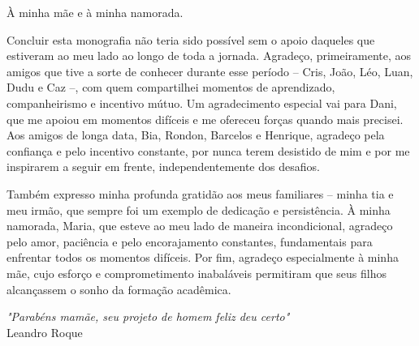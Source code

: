 \documentclass[embeddedlogo, nohidelinks, arial]{ufsc-thesis-rn46-2019}
\theoremstyle{definition}
\begin{document}

\pretextual%
\imprimircapa%
\imprimirfolhaderosto*
\protect{}
\imprimirfolhadecertificacao

\begin{dedicatoria}
À minha mãe e à minha namorada.
\end{dedicatoria}

\begin{agradecimentos}
  Concluir esta monografia não teria sido possível sem o apoio daqueles que estiveram ao meu lado ao longo de toda a jornada. Agradeço, primeiramente, aos amigos que tive a sorte de conhecer durante esse período – Cris, João, Léo, Luan, Dudu e Caz –, com quem compartilhei momentos de aprendizado, companheirismo e incentivo mútuo. Um agradecimento especial vai para Dani, que me apoiou em momentos difíceis e me ofereceu forças quando mais precisei. Aos amigos de longa data, Bia, Rondon, Barcelos e Henrique, agradeço pela confiança e pelo incentivo constante, por nunca terem desistido de mim e por me inspirarem a seguir em frente, independentemente dos desafios.

  Também expresso minha profunda gratidão aos meus familiares – minha tia e meu irmão, que sempre foi um exemplo de dedicação e persistência. À minha namorada, Maria, que esteve ao meu lado de maneira incondicional, agradeço pelo amor, paciência e pelo encorajamento constantes, fundamentais para enfrentar todos os momentos difíceis. Por fim, agradeço especialmente à minha mãe, cujo esforço e comprometimento inabaláveis permitiram que seus filhos alcançassem o sonho da formação acadêmica.
\end{agradecimentos}

\begin{epigrafe}
\textit{"Parabéns mamãe, seu projeto de homem feliz deu certo"} \\ Leandro Roque
\end{epigrafe}
\end{document}
